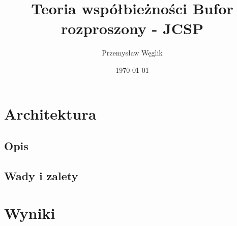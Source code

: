 \documentclass[12pt,a4paper,table]{article}
\begin{document}
    \title {
        Teoria współbieżności
        Bufor rozproszony - JCSP
    }

    \author{
        Przemysław Węglik
    }

    \date{\today}

    \maketitle

    \section{Architektura}

    \subsection{Opis}

    \subsection{Wady i zalety}

    \section{Wyniki}
\end{document}
